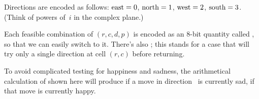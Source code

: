 Directions are encoded as follows: $\rm east=0$, $%
\rm north=1$,
$\rm west=2$, $\rm south=3$. (Think of powers of~$i$ in the complex
plane.)

Each feasible combination of $(r,c,d,p)$ is encoded as an 8-bit quantity
called , so that we can easily switch to it.
There's also ; this stands for a case that will
try
only a single direction  at cell $(r,c)$ before returning.

To avoid complicated testing for happiness and sadness, the arithmetical
calculation of  shown here will produce  if a move in
direction~ is currently sad,  if that move is currently
happy.

